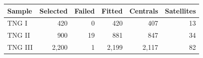 \begin{tabular}{lrrrrr}
\toprule
Sample & Selected & Failed & Fitted & Centrals & Satellites \\
\midrule
TNG I & 420 & 0 & 420 & 407 & 13 \\
TNG II & 900 & 19 & 881 & 847 & 34 \\
TNG III & 2,200 & 1 & 2,199 & 2,117 & 82 \\
\bottomrule
\end{tabular}
